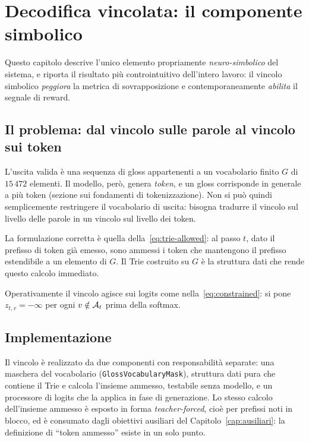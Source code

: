 \chapter{Decodifica vincolata: il componente simbolico}
\label{cap:decoding}

Questo capitolo descrive l'unico elemento propriamente \emph{neuro-simbolico} del
sistema, e riporta il risultato più controintuitivo dell'intero lavoro: il
vincolo simbolico \emph{peggiora} la metrica di sovrapposizione e
contemporaneamente \emph{abilita} il segnale di reward.

\section{Il problema: dal vincolo sulle parole al vincolo sui token}

L'uscita valida è una sequenza di gloss appartenenti a un vocabolario finito $G$
di $15\,472$ elementi. Il modello, però, genera \emph{token}, e un gloss
corrisponde in generale a più token (sezione sui fondamenti di tokenizzazione).
Non si può quindi semplicemente restringere il vocabolario di uscita: bisogna
tradurre il vincolo sul livello delle parole in un vincolo sul livello dei token.

La formulazione corretta è quella della~\eqref{eq:trie-allowed}: al passo $t$,
dato il prefisso di token già emesso, sono ammessi i token che mantengono il
prefisso estendibile a un elemento di $G$. Il Trie costruito su $G$ è la
struttura dati che rende questo calcolo immediato.

Operativamente il vincolo agisce sui logits come nella~\eqref{eq:constrained}:
si pone $z_{t,v} = -\infty$ per ogni $v \notin \mathcal{A}_t$ prima della softmax.


\section{Implementazione}

Il vincolo è realizzato da due componenti con responsabilità separate: una
maschera del vocabolario (\texttt{GlossVocabularyMask}), struttura dati pura che
contiene il Trie e calcola l'insieme ammesso, testabile senza modello, e un
processore di logits che la applica in fase di generazione. Lo stesso calcolo
dell'insieme ammesso è esposto in forma \emph{teacher-forced}, cioè per prefissi
noti in blocco, ed è consumato dagli obiettivi ausiliari del
Capitolo~\ref{cap:ausiliari}: la definizione di ``token ammesso'' esiste in un
solo punto.

